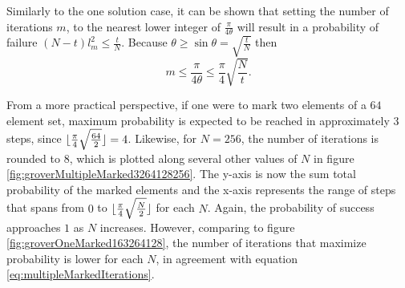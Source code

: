 \documentclass[../../dissertation.tex]{subfiles}
\begin{document}
Similarly to the one solution case, it can be shown that setting the number of iterations $m$, to the nearest lower integer of $\frac{\pi}{4\theta}$ will result in a probability of failure $(N-t)l^2_m \leq \frac{t}{N}$. Because $\theta \geq \sin\theta = \sqrt{\frac{t}{N}}$ then
\begin{equation}
	m \leq \frac{\pi}{4\theta} \leq \frac{\pi}{4}\sqrt{\frac{N}{t}}.
	\label{eq:multipleMarkedIterations}
\end{equation}\par
From a more practical perspective, if one were to mark two elements of a $64$ element set, maximum probability is expected to be reached in approximately 3 steps, since $\lfloor\frac{\pi}{4}\sqrt{\frac{64}{2}}\rfloor = 4$. Likewise, for $N=256$, the number of iterations is rounded to $8$, which is plotted along several other values of $N$ in figure \ref{fig:groverMultipleMarked3264128256}. The y-axis is now the sum total probability of the marked elements and the x-axis represents the range of steps that spans from $0$ to $\lfloor\frac{\pi}{4}\sqrt{\frac{N}{2}}\rfloor$ for each $N$.
Again, the probability of success approaches $1$ as $N$ increases. However, comparing to figure \ref{fig:groverOneMarked163264128}, the number of iterations that maximize probability is lower for each $N$, in agreement with equation \ref{eq:multipleMarkedIterations}.
\end{document}
